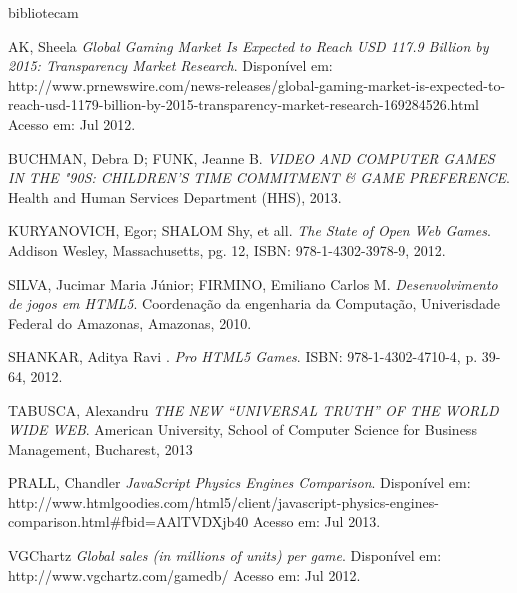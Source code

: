 \documentclass{article}
\begin{document}
%
%
bibliotecam\begin{thebibliography}{99}

        AK, Sheela
        \emph{ Global Gaming Market Is Expected to Reach USD 117.9 Billion by 2015: Transparency Market Research}.
        Disponível em: http://www.prnewswire.com/news-releases/global-gaming-market-is-expected-to-reach-usd-1179-billion-by-2015-transparency-market-research-169284526.html
        Acesso em: Jul 2012.


        BUCHMAN, Debra D; FUNK, Jeanne B. 
        \emph{VIDEO AND COMPUTER GAMES IN THE "90S: CHILDREN'S TIME COMMITMENT & GAME PREFERENCE}. 
        Health and Human Services Department (HHS), 2013.


        KURYANOVICH, Egor; SHALOM Shy, et all.
        \emph{The State of Open Web Games}.
        Addison Wesley, Massachusetts, pg. 12,
        ISBN: 978-1-4302-3978-9,
        2012.

        SILVA, Jucimar Maria Júnior; FIRMINO, Emiliano Carlos M.
        \emph{Desenvolvimento de jogos em HTML5}.
        Coordenação da engenharia da Computação,
        Univerisdade Federal do Amazonas,
        Amazonas,
        2010.

        SHANKAR, Aditya Ravi .
        \emph{Pro HTML5 Games}.
        ISBN: 978-1-4302-4710-4, p. 39-64,
        2012.

        TABUSCA, Alexandru
        \emph{THE NEW “UNIVERSAL TRUTH” OF THE WORLD WIDE WEB}.
        American University, School of Computer Science for
        Business Management, Bucharest, 2013

        PRALL, Chandler
        \emph{JavaScript Physics Engines Comparison}.
        Disponível em: http://www.htmlgoodies.com/html5/client/javascript-physics-engines-comparison.html#fbid=AAlTVDXjb40
        Acesso em: Jul 2013.

        VGChartz
        \emph{Global sales (in millions of units) per game}.
        Disponível em: http://www.vgchartz.com/gamedb/
        Acesso em: Jul 2012.




\end{thebibliography}
\end{document}
